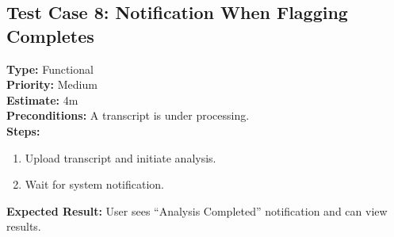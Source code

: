 \documentclass[12pt]{article}
\begin{document}
\subsection*{Test Case 8: Notification When Flagging Completes}
\textbf{Type:} Functional \\
\textbf{Priority:} Medium \\
\textbf{Estimate:} 4m \\
\textbf{Preconditions:} A transcript is under processing. \\
\textbf{Steps:}
\begin{enumerate}[label=\arabic*.]
\item Upload transcript and initiate analysis.
\item Wait for system notification.
\end{enumerate}
\textbf{Expected Result:} User sees “Analysis Completed” notification and can view results.
\end{document}
